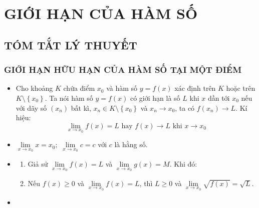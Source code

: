 \def\tenchude{GIỚI HẠN HÀM SỐ}
\section{GIỚI HẠN CỦA HÀM SỐ}
\subsection{TÓM TẮT LÝ THUYẾT}
\subsubsection{GIỚI HẠN HỮU HẠN CỦA HÀM SỐ TẠI MỘT ĐIỂM}
\begin{itemize}
	\item [\iconMT]  Cho khoảng $K$ chứa điểm $x_0$ và hàm số $y=f(x)$ xác định trên $K$ hoặc trên $K\setminus \left\{{x_0}\right\} $. Ta nói hàm số $y=f(x)$ có giới hạn là số $L$ khi $x$ dần tới $x_0$ nếu với dãy số $\left({x_n}\right)$ bất kì, $x_n\in K\setminus \left\{{x_0}\right\}$ và $x_n\to x_0$, ta có $f\left({x_n}\right)\to L $. Kí hiệu:
	$$\lim\limits_{x\to x_0}f(x)=L \text{ hay } f(x)\to L \text{ khi } x\to x_0 $$
	\item [\iconMT]  $\lim\limits_{x\to x_0}x=x_0;$ $\lim\limits_{x\to x_0}c=c$ với $c$ là hằng số.
	\item [\iconMT] 
	\begin{khung}
		\begin{enumerate}
			\item Giả sử $\lim\limits_{x\to x_0}f(x)=L$ và $\lim\limits_{x\to x_0}g(x)=M$. Khi đó:
			\item Nếu $f(x)\geqslant 0$ và $\lim\limits_{x\to x_0}f(x)=L$, thì $L\geqslant 0$ và $\lim\limits_{x\to x_0}\sqrt{{f(x)}}=\sqrt{L} $.
		\end{enumerate}
	\end{khung}
\item [\iconMT] 

\end{itemize}

